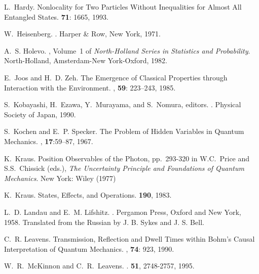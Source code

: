 \documentclass[12pt]{article}
\begin{document}
\begin{thebibliography}{10}
 L.~Hardy.  \newblock Nonlocality for Two Particles
   Without Inequalities for Almost All Entangled States.
    {\bf 71}: 1665, 1993.

 W.~Heisenberg.  . \newblock Harper \& Row, New York,
   1971.

 A.~S. Holevo.  , Volume~1 of {\em
     North-Holland Series in Statistics and Probability}.  \newblock
   North-Holland, Amsterdam-New York-Oxford, 1982.

 E.~Joos and H.~D. Zeh.  \newblock The {E}mergence of
   {C}lassical {P}roperties through {I}nteraction with the
   {E}nvironment.  , {\bf
     59}: 223--243, 1985.

 S.~Kobayashi, H.~Ezawa, Y.~Murayama, and S.~Nomura,
   editors.  . Physical Society of Japan, 1990.

 S.~Kochen and E.~P. Specker.  \newblock The {P}roblem
   of {H}idden {V}ariables in {Q}uantum {M}echanics.  , {\bf 17}:59--87, 1967.

 K.~Kraus. \newblock Position Observables of the
   Photon, pp.~293-320 in W.C.~Price and S.S.~Chissick (eds.),
   \textit{The Uncertainty Principle and Foundations of Quantum
     Mechanics}. New York: Wiley (1977)

 K.~Kraus.  \newblock States, {E}ffects, and
   {O}perations.   {\bf 190},
   1983.

 L.~D. Landau and E.~M. Lifshitz.  .  \newblock
   Pergamon Press, Oxford and New York, 1958.  \newblock Translated
   {}from the Russian by J. B. Sykes and J. S. Bell.

 C.~R. Leavens.  \newblock Transmission, {R}eflection
   and {D}well {T}imes within {B}ohm's {C}ausal {I}nterpretation of
   {Q}uantum {M}echanics.  ,
   {\bf 74}: 923, 1990.

 W.~R.~McKinnon and C.~R.~Leavens.
   .   {\bf 51}, 2748-2757, 1995.


\end{thebibliography}
\end{document}
